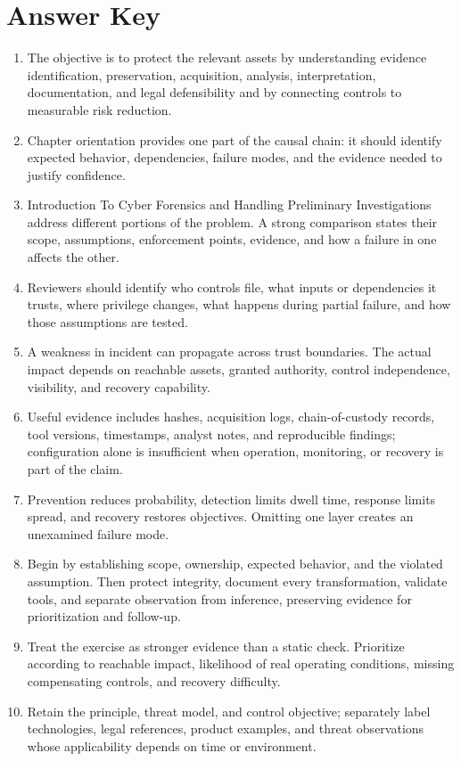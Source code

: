 \documentclass[11pt]{article}
\begin{document}
\section*{Answer Key}
\begin{enumerate}
\item The objective is to protect the relevant assets by understanding evidence identification, preservation, acquisition, analysis, interpretation, documentation, and legal defensibility and by connecting controls to measurable risk reduction.
\item Chapter orientation provides one part of the causal chain: it should identify expected behavior, dependencies, failure modes, and the evidence needed to justify confidence.
\item Introduction To Cyber Forensics and Handling Preliminary Investigations address different portions of the problem. A strong comparison states their scope, assumptions, enforcement points, evidence, and how a failure in one affects the other.
\item Reviewers should identify who controls file, what inputs or dependencies it trusts, where privilege changes, what happens during partial failure, and how those assumptions are tested.
\item A weakness in incident can propagate across trust boundaries. The actual impact depends on reachable assets, granted authority, control independence, visibility, and recovery capability.
\item Useful evidence includes hashes, acquisition logs, chain-of-custody records, tool versions, timestamps, analyst notes, and reproducible findings; configuration alone is insufficient when operation, monitoring, or recovery is part of the claim.
\item Prevention reduces probability, detection limits dwell time, response limits spread, and recovery restores objectives. Omitting one layer creates an unexamined failure mode.
\item Begin by establishing scope, ownership, expected behavior, and the violated assumption. Then protect integrity, document every transformation, validate tools, and separate observation from inference, preserving evidence for prioritization and follow-up.
\item Treat the exercise as stronger evidence than a static check. Prioritize according to reachable impact, likelihood of real operating conditions, missing compensating controls, and recovery difficulty.
\item Retain the principle, threat model, and control objective; separately label technologies, legal references, product examples, and threat observations whose applicability depends on time or environment.
\end{enumerate}
\end{document}
